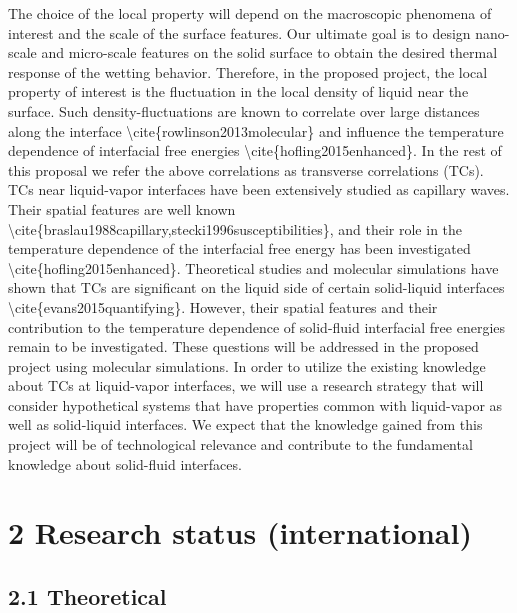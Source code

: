 \par The choice of the local property will depend on the macroscopic phenomena of interest and the scale of the surface features. Our  ultimate goal is to design nano-scale and micro-scale features on the solid surface to obtain the desired thermal response of the wetting behavior. Therefore, in the proposed project, the local property of interest is the fluctuation in the local density of liquid near the surface.  Such density-fluctuations are known to correlate over large distances along the interface \textbackslash cite\{rowlinson2013molecular\} and influence the temperature dependence of interfacial free energies \textbackslash cite\{hofling2015enhanced\}. In the rest of this proposal we refer the above correlations as transverse correlations (TCs). TCs near liquid-vapor interfaces have been extensively studied as capillary waves. Their spatial features are well known \textbackslash cite\{braslau1988capillary,stecki1996susceptibilities\}, and their role in the temperature dependence of the interfacial free energy has been investigated \textbackslash cite\{hofling2015enhanced\}. Theoretical studies and molecular simulations have shown that TCs are significant on the liquid side of certain solid-liquid interfaces \textbackslash cite\{evans2015quantifying\}. However, their  spatial features and their contribution to the temperature dependence of solid-fluid interfacial free energies remain to be investigated. These questions will be addressed in the proposed project using molecular simulations. In order to utilize the existing knowledge about TCs at liquid-vapor interfaces, we will use a research strategy that will consider hypothetical systems that have properties common with liquid-vapor as well as solid-liquid interfaces. We expect that the knowledge gained from this project will be of technological relevance and contribute to the fundamental knowledge about solid-fluid interfaces.\section{2 Research status (international)}
\subsection{2.1 Theoretical}

